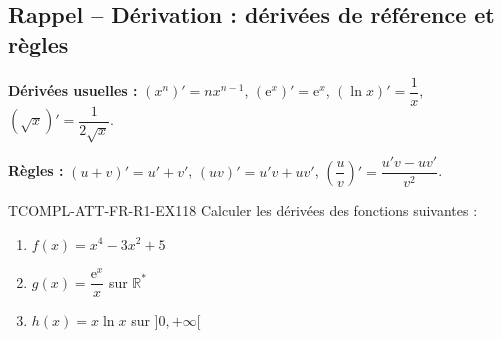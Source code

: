 

\subsection*{Rappel -- Dérivation : dérivées de référence et règles}

\textbf{Dérivées usuelles :} $(x^n)' = n x^{n-1}$, $(\mathrm{e}^x)' = \mathrm{e}^x$, $(\ln x)' = \dfrac{1}{x}$, $(\sqrt{x})' = \dfrac{1}{2\sqrt{x}}$.

\textbf{Règles :} $(u+v)' = u' + v'$, $(uv)' = u'v + uv'$, $\left(\dfrac{u}{v}\right)' = \dfrac{u'v - uv'}{v^2}$.

\begin{exercice}{TCOMPL-ATT-FR-R1-EX1}{1}{8}
Calculer les dérivées des fonctions suivantes :
\begin{enumerate}
  \item $f(x) = x^4 - 3x^2 + 5$
  \item $g(x) = \dfrac{\mathrm{e}^x}{x}$ sur $\mathbb{R}^*$
  \item $h(x) = x \ln x$ sur $]0, +\infty[$
\end{enumerate}
\end{exercice}

